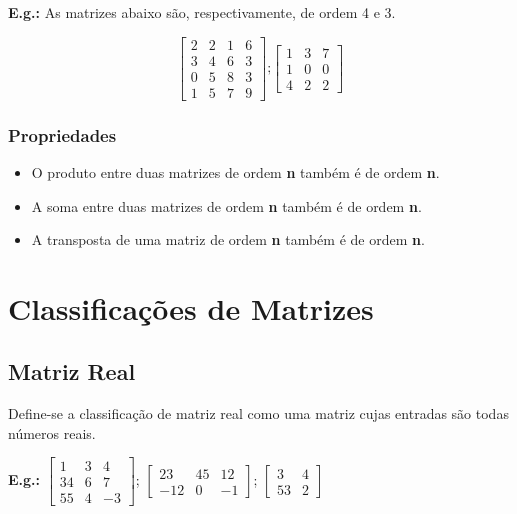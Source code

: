 \documentclass[a4paper,12pt]{article}
\begin{document}
\textbf{E.g.:} As matrizes abaixo são, respectivamente, de ordem 4 e 3.

$$ \begin{bmatrix}
2 & 2 & 1 & 6 \\
3 & 4 & 6 & 3 \\
0 & 5 & 8 & 3 \\
1 & 5 & 7 & 9
\end{bmatrix} \text{;} \begin{bmatrix}
    1 & 3 & 7 \\
    1 & 0 & 0 \\
    4 & 2 & 2
\end{bmatrix}
$$

\subsubsection{Propriedades}

\begin{itemize}
    \item O produto entre duas matrizes de ordem \textbf{n} também é de ordem \textbf{n}.
    
    \item A soma entre duas matrizes de ordem \textbf{n} também é de ordem \textbf{n}.
    
    \item A transposta de uma matriz de ordem \textbf{n} também é de ordem \textbf{n}.
    
\end{itemize}

\newpage

\section{Classificações de Matrizes}

\subsection{Matriz Real}
Define-se a classificação de matriz real como uma matriz cujas entradas são todas números reais.

\textbf{E.g.:} $ \begin{bmatrix}
1 & 3 & 4\\
34 & 6 & 7 \\
55 & 4 & -3
\end{bmatrix} $; $ \begin{bmatrix}
23 & 45 & 12\\
-12 & 0 & -1
\end{bmatrix} $; $ \begin{bmatrix}
3 & 4\\
53 & 2
\end{bmatrix}$
\end{document}
